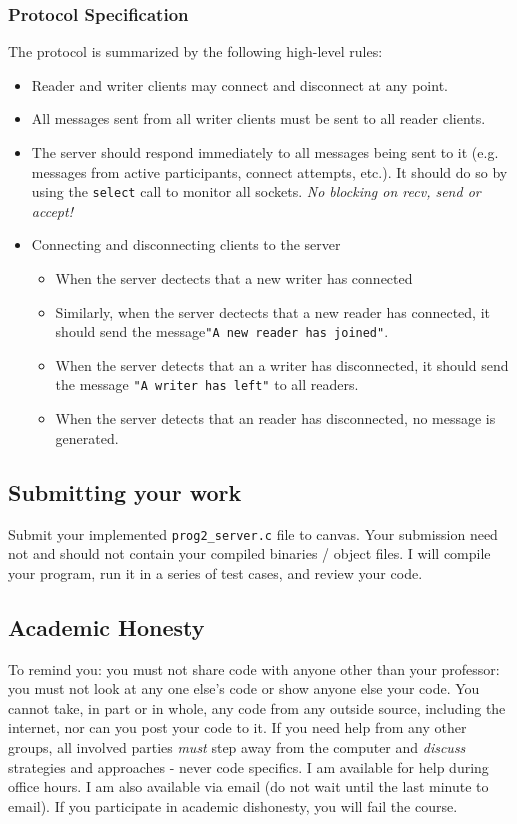 \documentclass[12pt]{article}
\begin{document}
\subsubsection*{Protocol Specification}
The protocol is summarized by the following high-level rules:
\begin{itemize}
    \item \setlength{\parskip}{-3pt} Reader and writer clients may connect and disconnect at any point.
    \item All messages sent from all writer clients must be sent to all reader clients.
    \item The server should respond immediately to all messages being sent to it (e.g. messages from active participants, connect attempts, etc.).  It should do so by using the \verb|select| call to monitor all sockets.  {\it No blocking on recv, send or accept!}
	\item \setlength{\parskip}{-3pt} Connecting and disconnecting clients to the server
        \begin{itemize}
            \item \setlength{\parskip}{-3pt} When the server dectects that a new writer has connected
	    \item Similarly, when the server dectects that a new reader has connected, it should send the message\verb|"A new reader has joined"|.
            \item When the server detects that an a writer has disconnected, it should send the message \verb|"A writer has left"| to all readers. 
            \item When the server detects that an reader has disconnected, no message is generated. 
        \end{itemize}
\end{itemize}

\subsection*{Submitting your work}
Submit your implemented \verb|prog2_server.c| file to canvas. Your submission need not and should not contain your compiled binaries / object
files. I will compile your program, run it in a series of test cases, and review your code.

\subsection*{Academic Honesty}
To remind you: you must not share code with anyone other than your professor: you must not look at any one else's code or show anyone else your code. You cannot take, in part or in whole, any code from any outside source, including the internet, nor can you post your code to it.  If you need help from any other groups, all involved parties {\it must} step away from the computer and \textit{discuss} strategies and approaches - never code specifics.  I am available for help during office hours.  I am also available via email (do not wait until the last minute to email). If you participate in academic dishonesty, you will fail the course.
\end{document}
